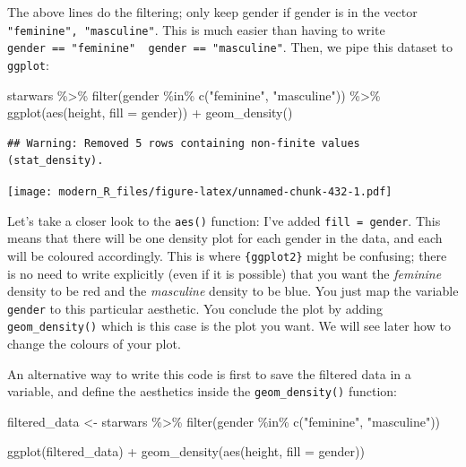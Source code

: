 \documentclass[
]{article}
\newenvironment{Shaded}{\begin{snugshade}}{\end{snugshade}}
\newcommand{\AttributeTok}[1]{\textcolor[rgb]{0.77,0.63,0.00}{#1}}
\newcommand{\FunctionTok}[1]{\textcolor[rgb]{0.00,0.00,0.00}{#1}}
\newcommand{\NormalTok}[1]{#1}
\newcommand{\OtherTok}[1]{\textcolor[rgb]{0.56,0.35,0.01}{#1}}
\newcommand{\SpecialCharTok}[1]{\textcolor[rgb]{0.00,0.00,0.00}{#1}}
\newcommand{\StringTok}[1]{\textcolor[rgb]{0.31,0.60,0.02}{#1}}
\begin{document}
The above lines do the filtering; only keep gender if gender is in the vector \texttt{"feminine",\ "masculine"}.
This is much easier than having to write \texttt{gender\ ==\ "feminine"\ \textbar{}\ gender\ ==\ "masculine"}. Then, we pipe
this dataset to \texttt{ggplot}:

\begin{Shaded}
\begin{Highlighting}[]
\NormalTok{starwars }\SpecialCharTok{\%\textgreater{}\%}
  \FunctionTok{filter}\NormalTok{(gender }\SpecialCharTok{\%in\%} \FunctionTok{c}\NormalTok{(}\StringTok{"feminine"}\NormalTok{, }\StringTok{"masculine"}\NormalTok{)) }\SpecialCharTok{\%\textgreater{}\%}
  \FunctionTok{ggplot}\NormalTok{(}\FunctionTok{aes}\NormalTok{(height, }\AttributeTok{fill =}\NormalTok{ gender)) }\SpecialCharTok{+}
  \FunctionTok{geom\_density}\NormalTok{()}
\end{Highlighting}
\end{Shaded}

\begin{verbatim}
## Warning: Removed 5 rows containing non-finite values (stat_density).
\end{verbatim}

\texttt{[image: modern\_R\_files/figure-latex/unnamed-chunk-432-1.pdf]}

Let's take a closer look to the \texttt{aes()} function: I've added \texttt{fill\ =\ gender}. This means that
there will be one density plot for each gender in the data, and each will be coloured accordingly.
This is where \texttt{\{ggplot2\}} might be confusing; there is no need to write explicitly (even if it is
possible) that you want the \emph{feminine} density to be red and the \emph{masculine} density to be blue. You just
map the variable \texttt{gender} to this particular aesthetic. You conclude the plot by adding
\texttt{geom\_density()} which is this case is the plot you want. We will see later how to change the
colours of your plot.

An alternative way to write this code is first to save the filtered data in a variable, and define
the aesthetics inside the \texttt{geom\_density()} function:

\begin{Shaded}
\begin{Highlighting}[]
\NormalTok{filtered\_data }\OtherTok{\textless{}{-}}\NormalTok{ starwars }\SpecialCharTok{\%\textgreater{}\%}
  \FunctionTok{filter}\NormalTok{(gender }\SpecialCharTok{\%in\%} \FunctionTok{c}\NormalTok{(}\StringTok{"feminine"}\NormalTok{, }\StringTok{"masculine"}\NormalTok{))}

\FunctionTok{ggplot}\NormalTok{(filtered\_data) }\SpecialCharTok{+}
  \FunctionTok{geom\_density}\NormalTok{(}\FunctionTok{aes}\NormalTok{(height, }\AttributeTok{fill =}\NormalTok{ gender))}
\end{Highlighting}
\end{Shaded}
\end{document}

